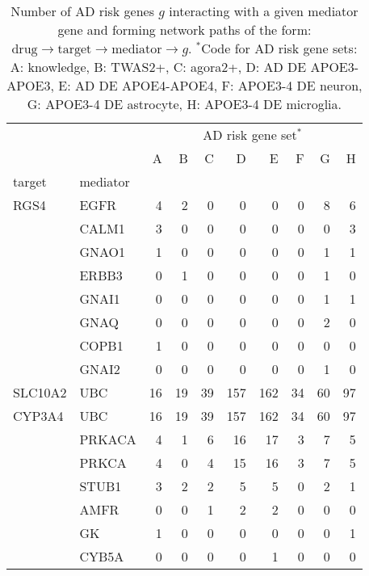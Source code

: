 \documentclass[letterpaper]{article}
\begin{document}
\begin{table}[p]
\begin{tabular}{ll|rrrrrrrr}
\toprule
       &       &   \multicolumn{8}{c}{AD risk gene set$^\ast$} \\
       &       &   A &   B &   C &    D &    E &   F &   G &   H \\
target & mediator &     &     &     &      &      &     &     &     \\
\midrule
RGS4 & EGFR &   4 &   2 &   0 &    0 &    0 &   0 &   8 &   6 \\
       & CALM1 &   3 &   0 &   0 &    0 &    0 &   0 &   0 &   3 \\
       & GNAO1 &   1 &   0 &   0 &    0 &    0 &   0 &   1 &   1 \\
       & ERBB3 &   0 &   1 &   0 &    0 &    0 &   0 &   1 &   0 \\
       & GNAI1 &   0 &   0 &   0 &    0 &    0 &   0 &   1 &   1 \\
       & GNAQ &   0 &   0 &   0 &    0 &    0 &   0 &   2 &   0 \\
       & COPB1 &   1 &   0 &   0 &    0 &    0 &   0 &   0 &   0 \\
       & GNAI2 &   0 &   0 &   0 &    0 &    0 &   0 &   1 &   0 \\
\midrule
SLC10A2 & UBC &  16 &  19 &  39 &  157 &  162 &  34 &  60 &  97 \\
\midrule
CYP3A4 & UBC &  16 &  19 &  39 &  157 &  162 &  34 &  60 &  97 \\
       & PRKACA &   4 &   1 &   6 &   16 &   17 &   3 &   7 &   5 \\
       & PRKCA &   4 &   0 &   4 &   15 &   16 &   3 &   7 &   5 \\
       & STUB1 &   3 &   2 &   2 &    5 &    5 &   0 &   2 &   1 \\
       & AMFR &   0 &   0 &   1 &    2 &    2 &   0 &   0 &   0 \\
       & GK &   1 &   0 &   0 &    0 &    0 &   0 &   0 &   1 \\
       & CYB5A &   0 &   0 &   0 &    0 &    1 &   0 &   0 &   0 \\
\bottomrule
\end{tabular}
\caption{
  Number of AD risk genes $g$ interacting with a given mediator gene and forming
  network paths of the form: $\mathrm{drug} \rightarrow \mathrm{target}
  \rightarrow \mathrm{mediator} \rightarrow g$.  $^\ast$Code for AD risk gene sets:
  A: knowledge, B: TWAS2+, C: agora2+, D: AD DE APOE3-APOE3, E: AD DE
  APOE4-APOE4, F: APOE3-4 DE neuron, G: APOE3-4 DE astrocyte, H: APOE3-4 DE
  microglia.
}
\label{tab:mediators}
\end{table}
\end{document}
